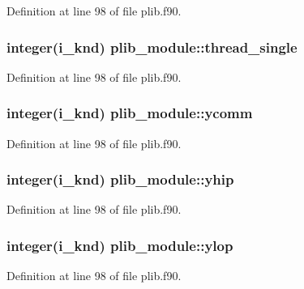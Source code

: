 Definition at line 98 of file plib.\-f90.

\hypertarget{classplib__module_a976973aed6846d0da2cc7fc29e0f0097}{
\subsubsection[{thread\-\_\-single}]{\setlength{\rightskip}{0pt plus 5cm}integer(i\-\_\-knd) plib\-\_\-module\-::thread\-\_\-single}}\label{classplib__module_a976973aed6846d0da2cc7fc29e0f0097}


Definition at line 98 of file plib.\-f90.

\hypertarget{classplib__module_af98dd05eb9d15041b5c783c6be090495}{
\subsubsection[{ycomm}]{\setlength{\rightskip}{0pt plus 5cm}integer(i\-\_\-knd) plib\-\_\-module\-::ycomm}}\label{classplib__module_af98dd05eb9d15041b5c783c6be090495}


Definition at line 98 of file plib.\-f90.

\hypertarget{classplib__module_a5520d897cd8da06d1815c1ec27010cf3}{
\subsubsection[{yhip}]{\setlength{\rightskip}{0pt plus 5cm}integer(i\-\_\-knd) plib\-\_\-module\-::yhip}}\label{classplib__module_a5520d897cd8da06d1815c1ec27010cf3}


Definition at line 98 of file plib.\-f90.

\hypertarget{classplib__module_a95589a7523a49a05f8af1b39f7e75df8}{
\subsubsection[{ylop}]{\setlength{\rightskip}{0pt plus 5cm}integer(i\-\_\-knd) plib\-\_\-module\-::ylop}}\label{classplib__module_a95589a7523a49a05f8af1b39f7e75df8}


Definition at line 98 of file plib.\-f90.

